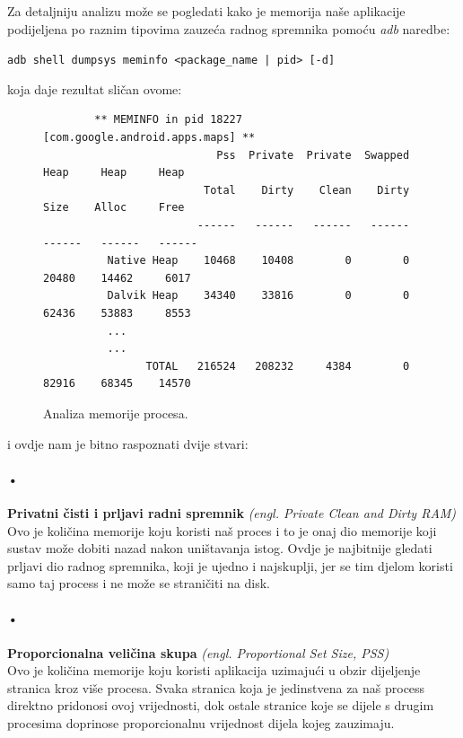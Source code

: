 \documentclass[times, utf8, zavrsni]{fer}
\begin{document}
Za detaljniju analizu može se pogledati kako je memorija naše aplikacije podijeljena po raznim tipovima zauzeća radnog spremnika pomoću \textit{adb} naredbe:

\begin{center}
\verb=adb shell dumpsys meminfo <package_name | pid> [-d]=
\end{center}
koja daje rezultat sličan ovome:

\begin{figure}[ht!]
\centering
\begingroup
    \fontsize{9pt}{12pt}\selectfont
		\begin{verbatim}
		** MEMINFO in pid 18227 [com.google.android.apps.maps] **
		                   Pss  Private  Private  Swapped     Heap     Heap     Heap
		                 Total    Dirty    Clean    Dirty     Size    Alloc     Free
		                ------   ------   ------   ------   ------   ------   ------
		  Native Heap    10468    10408        0        0    20480    14462     6017
		  Dalvik Heap    34340    33816        0        0    62436    53883     8553
		  ...
		  ...
		        TOTAL   216524   208232     4384        0    82916    68345    14570
\end{verbatim}
\endgroup
\caption{Analiza memorije procesa.}
\label{overflow}
\end{figure}

\noindent
i ovdje nam je bitno raspoznati dvije stvari:


\paragraph{•}
\textbf{Privatni čisti i prljavi radni spremnik} \textit{(engl. Private Clean and Dirty RAM)}\\
Ovo je količina memorije koju koristi naš proces i to je onaj dio memorije koji sustav može dobiti nazad nakon uništavanja istog. Ovdje je najbitnije gledati prljavi dio radnog spremnika, koji je ujedno i najskuplji, jer se tim djelom koristi samo taj process i ne može se straničiti na disk.

\paragraph{•}
\textbf{Proporcionalna veličina skupa} \textit{(engl. Proportional Set Size, PSS)}\\
Ovo je količina memorije koju koristi aplikacija uzimajući u obzir dijeljenje stranica kroz više procesa. Svaka stranica koja je jedinstvena za naš process direktno pridonosi ovoj vrijednosti, dok ostale stranice koje se dijele s drugim procesima doprinose proporcionalnu vrijednost dijela kojeg zauzimaju.
\end{document}
